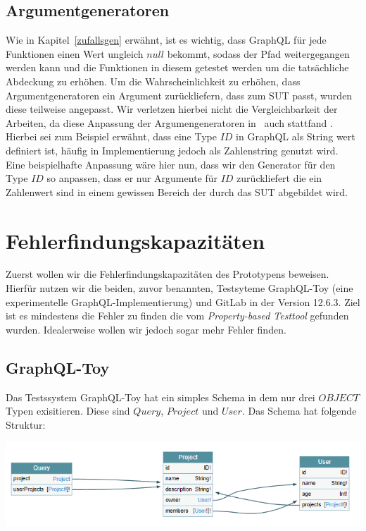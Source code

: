 \subsection{Argumentgeneratoren}

Wie in Kapitel~\ref{zufallsgen} erwähnt, ist es wichtig, dass GraphQL für jede Funktionen einen Wert ungleich $null$ bekommt, sodass der
Pfad weitergegangen werden kann und die Funktionen in diesem getestet werden um die tatsächliche Abdeckung zu erhöhen.
Um die Wahrscheinlichkeit zu erhöhen, dass Argumentgeneratoren ein Argument zurückliefern, dass zum SUT passt, wurden diese teilweise angepasst.
Wir verletzen hierbei nicht die Vergleichbarkeit der Arbeiten, da diese Anpassung der Argumengeneratoren in~\cite{property-based-testing} auch stattfand \cite[vgl. Experimental Setup and Method]{property-based-testing}.
Hierbei sei zum Beispiel erwähnt, dass eine Type $ID$ in GraphQL als String wert definiert ist, häufig in Implementierung jedoch als Zahlenstring genutzt wird.
Eine beispielhafte Anpassung wäre hier nun, dass wir den Generator für den Type $ID$ so anpassen, dass er nur Argumente für $ID$ zurückliefert die ein Zahlenwert sind
in einem gewissen Bereich der durch das SUT abgebildet wird.

\section{Fehlerfindungskapazitäten}

Zuerst wollen wir die Fehlerfindungskapazitäten des Prototypens beweisen.
Hierfür nutzen wir die beiden, zuvor benannten, Testsyteme GraphQL-Toy (eine experimentelle GraphQL-Implementierung) und GitLab in der Version 12.6.3.
Ziel ist es mindestens die Fehler zu finden die vom \textit{Property-based Testtool}\cite{property-based-testing} gefunden wurden.
Idealerweise wollen wir jedoch sogar mehr Fehler finden.

\subsection{GraphQL-Toy}

Das Testssystem GraphQL-Toy hat ein simples Schema in dem nur drei $OBJECT$ Typen exisitieren.
Diese sind $Query$, $Project$ und $User$.
Das Schema hat folgende Struktur: \\
\begin{center}
    \includegraphics[width=\textwidth,height=\textheight,keepaspectratio]{img/graphqltoy}
\end{center}

